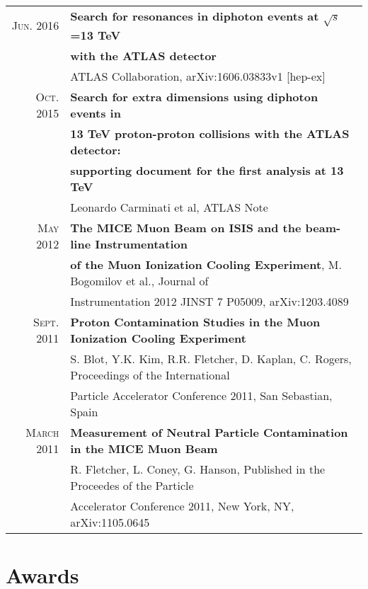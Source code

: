 \documentclass[a4paper,10pt]{article} %
\begin{document}
\begin{tabular}{rl}
\textsc{Jun.} 2016 & \textbf{Search for resonances in diphoton events at $\sqrt{s}$=13 TeV} \\
									& \textbf{with the ATLAS detector} \\
									& ATLAS Collaboration,  arXiv:1606.03833v1 [hep-ex] \\
\textsc{Oct.} 2015 & \textbf{Search for extra dimensions using diphoton events in} \\
									 & \textbf{13 TeV proton-proton collisions with the ATLAS detector:} \\
									 & \textbf{supporting document for the first analysis at 13 TeV} \\
									 & Leonardo Carminati et al, ATLAS Note \\
\textsc{May} 2012  & \textbf{The MICE Muon Beam on ISIS and the beam-line Instrumentation} \\
                   & \textbf{of the Muon Ionization Cooling Experiment}, M. Bogomilov et al., Journal of \\
				   & Instrumentation 2012 JINST 7 P05009, arXiv:1203.4089 \\
\textsc{Sept.} 2011 & \textbf{Proton Contamination Studies in the Muon Ionization Cooling Experiment} \\
					& S. Blot, Y.K. Kim, R.R. Fletcher, D. Kaplan, C. Rogers, Proceedings of the International \\
					& Particle Accelerator Conference 2011, San Sebastian, Spain \\
\textsc{March} 2011 & \textbf{Measurement of Neutral Particle Contamination in the MICE Muon Beam}\\
					& R. Fletcher, L. Coney, G. Hanson, Published in the Proceedes of the Particle \\
                    & Accelerator Conference 2011, New York, NY, arXiv:1105.0645\\

\end{tabular}


\section{Awards}
\end{document}
